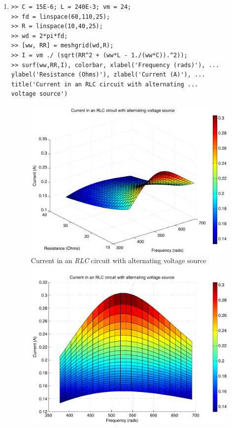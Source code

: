 \begin{enumerate}
\clearpage
\item
\begin{lstlisting}
>> C = 15E-6; L = 240E-3; vm = 24;
>> fd = linspace(60,110,25);
>> R = linspace(10,40,25);
>> wd = 2*pi*fd;
>> [ww, RR] = meshgrid(wd,R);
>> I = vm ./ (sqrt(RR^2 + (ww*L - 1./(ww*C)).^2));
>> surf(ww,RR,I), colorbar, xlabel('Frequency (rads)'), ...
ylabel('Resistance (Ohms)'), zlabel('Current (A)'), ...
title('Current in an RLC circuit with alternating ...
voltage source')
\end{lstlisting}
\begin{figure}[h]
	\myfloatalign
	\includegraphics[width=\linewidth]{Graphics/Additional-Ex/3D-RLC-plot}
	\caption{Current in an \textit{RLC} circuit with alternating voltage source}
	\label{fig:3D-RLC-plot}
\end{figure}
\begin{figure}[h]
	\myfloatalign
	\includegraphics[width=\linewidth]{Graphics/Additional-Ex/3D-RLC-plot-rotate}

\end{figure}
\end{enumerate}

